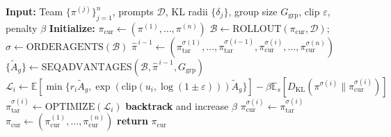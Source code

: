 \documentclass[sigconf]{aamas}
\begin{document}
\begin{algorithm}[t]
\caption{Sequential Agent Tuning (SAT)}
\label{alg:sat}
\begin{algorithmic}[1]
\State \textbf{Input:} Team $\{\pi^{(j)}\}_{j=1}^{n}$, prompts $\mathcal{D}$, KL radii $\{\delta_j\}$, group size $G_{\text{grp}}$, clip $\varepsilon$, penalty $\beta$
\State \textbf{Initialize:} $\pi_{\text{cur}} \gets (\pi^{(1)}, \ldots, \pi^{(n)})$
  \State $\mathcal{B} \gets \text{ROLLOUT}(\pi_{\text{cur}}, \mathcal{D})$; \quad $\sigma \gets \text{ORDERAGENTS}(\mathcal{B})$ {\color{red}}
    \State $\hat{\pi}^{\,i-1} \gets (\pi^{\sigma(1)}_{\text{tar}}, \ldots, \pi^{\sigma(i-1)}_{\text{tar}}, \pi^{\sigma(i)}_{\text{cur}}, \ldots, \pi^{\sigma(n)}_{\text{cur}})$ 
    \State $\{\tilde{A}_g\} \gets \text{SEQADVANTAGES}(\mathcal{B}, \hat{\pi}^{\,i-1}, G_{\text{grp}})$ {\color{red}}
    \State $\mathcal{L}_i \gets \mathbb{E}[\min\{r_i \tilde{A}_g, \exp(\text{clip}(u_i, \log(1 \pm \varepsilon))) \tilde{A}_g\}] - \beta \mathbb{E}_s[D_{\text{KL}}(\pi^{\sigma(i)} \| \pi^{\sigma(i)}_{\text{cur}})]$
    \State $\pi^{\sigma(i)}_{\text{tar}} \gets \text{OPTIMIZE}(\mathcal{L}_i)$ {\color{red}}
     \textbf{backtrack} and increase $\beta$ {\color{red}}
    \EndIf
    \State $\pi^{\sigma(i)}_{\text{cur}} \gets \pi^{\sigma(i)}_{\text{tar}}$
  \EndFor
  \State $\pi_{\text{cur}} \gets (\pi^{(1)}_{\text{cur}}, \ldots, \pi^{(n)}_{\text{cur}})$ {\color{red}}
\EndFor
\State \textbf{return} $\pi_{\text{cur}}$
\end{algorithmic}
\end{algorithm}
\end{document}
